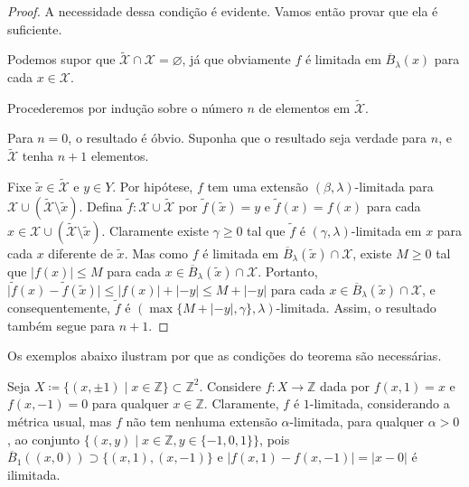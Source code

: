 \begin{proof}
  A necessidade dessa condição é evidente. Vamos então provar que ela é suficiente.

  Podemos supor que $\tilde{\mathcal{X}} \cap \mathcal{X} = \varnothing$, já que obviamente $f$ é limitada em $\overline{B}_{\lambda}(x)$ para cada $x \in \mathcal{X}$.

  Procederemos por indução sobre o número $n$ de elementos em $\tilde{\mathcal{X}}$.

  Para $n = 0$, o resultado é óbvio. Suponha que o resultado seja verdade para $n$, e $\tilde{\mathcal{X}}$ tenha $n+1$ elementos.

  Fixe $\tilde{x} \in \tilde{\mathcal{X}}$ e $y \in Y$. Por hipótese, $f$ tem uma extensão $(\beta,\lambda)$-limitada para $\mathcal{X} \cup (\tilde{\mathcal{X}} \setminus {\tilde{x}})$. Defina $\tilde{f} \colon \mathcal{X} \cup \tilde{\mathcal{X}}$ por $\tilde{f}(\tilde{x}) = y$ e $\tilde{f}(x) = f(x)$ para cada $x \in \mathcal{X} \cup (\tilde{\mathcal{X}} \setminus {\tilde{x}})$. Claramente existe $\gamma \ge 0$ tal que $\tilde{f}$ é $(\gamma,\lambda)$-limitada em $x$ para cada $x$ diferente de $\tilde{x}$. Mas como $f$ é limitada em $\overline{B}_{\lambda}(\tilde{x}) \cap \mathcal{X}$, existe $M \ge 0$ tal que $\lvert f(x) \rvert \le M$ para cada $x \in \overline{B}_{\lambda}(\tilde{x}) \cap \mathcal{X}$. Portanto, $\lvert \tilde{f}(x)-\tilde{f}(\tilde{x})\rvert \le \lvert f(x)\rvert + \lvert -y\rvert \le M + \lvert-y\rvert$ para cada $x \in \overline{B}_{\lambda}(\tilde{x}) \cap \mathcal{X}$, e consequentemente, $\tilde{f}$ é $(\max\{M + \lvert-y\rvert, \gamma\},\lambda)$-limitada. Assim, o resultado também segue para $n+1$.
\end{proof}

Os exemplos abaixo ilustram por que as condições do teorema são necessárias.

\begin{example}
  Seja $X \coloneqq \{(x, \pm 1) \mid x \in \mathbb{Z}\} \subset \mathbb{Z}^2$. Considere $f \colon X \to \mathbb{Z}$ dada por $f(x, 1) = x$ e $f(x, -1) = 0$ para qualquer $x \in \mathbb{Z}$. Claramente, $f$ é $1$-limitada, considerando a métrica usual, mas $f$ não tem nenhuma extensão $\alpha$-limitada, para qualquer $\alpha > 0$, ao conjunto $\{(x, y) \mid x \in \mathbb{Z}, y \in \{-1,0,1\}\}$, pois $\overline{B}_1((x, 0)) \supset \{ (x, 1), (x, -1) \}$ e $\lvert f(x, 1) - f(x, -1) \rvert = \lvert x - 0 \rvert$ é ilimitada.
\end{example}

